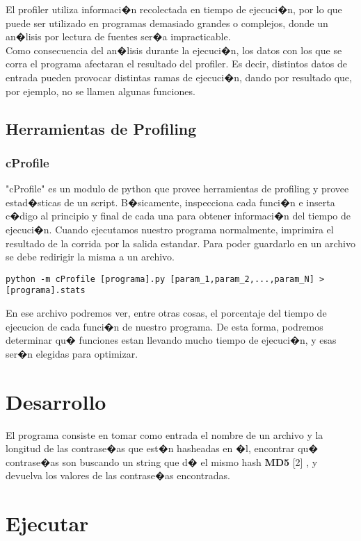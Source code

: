 \documentclass[a4paper,10pt,oneside]{article}
\begin{document}
El profiler utiliza informaci�n recolectada en tiempo de ejecuci�n, por lo que puede ser utilizado en programas demasiado grandes o complejos, donde un an�lisis por lectura de fuentes ser�a impracticable.\\
Como consecuencia del an�lisis durante la ejecuci�n, los datos con los que se corra el programa afectaran el resultado del profiler. 
	Es decir, distintos datos de entrada pueden provocar distintas ramas de ejecuci�n, dando por resultado que, por ejemplo, no se llamen algunas funciones.

\subsection{Herramientas de Profiling}

\subsubsection{cProfile}

"cProfile" es un modulo de python que provee herramientas de profiling y provee estad�sticas de un script. B�sicamente, inspecciona cada funci�n e inserta c�digo al principio y final de cada una para obtener informaci�n del tiempo de ejecuci�n. Cuando ejecutamos nuestro programa normalmente, imprimira el resultado de la corrida por la salida estandar. Para poder guardarlo en un archivo se debe redirigir la misma a un archivo. \\

\begin{center} \texttt{python -m cProfile [programa].py [param\_1,param\_2,...,param\_N] > [programa].stats} \end{center}

En ese archivo podremos ver, entre otras cosas, el porcentaje del tiempo de ejecucion de cada funci�n de nuestro programa. De esta forma, podremos determinar qu� funciones estan llevando mucho tiempo de ejecuci�n, y esas ser�n elegidas para optimizar.
	
\section{Desarrollo}
	El programa consiste en tomar como entrada el nombre de un archivo y la longitud de las contrase�as que est�n hasheadas en �l, encontrar qu� contrase�as son buscando un string que d� el mismo hash \textbf{MD5} [2] , y devuelva los valores de las contrase�as encontradas.
			
\section{Ejecutar}
	
\end{document}
